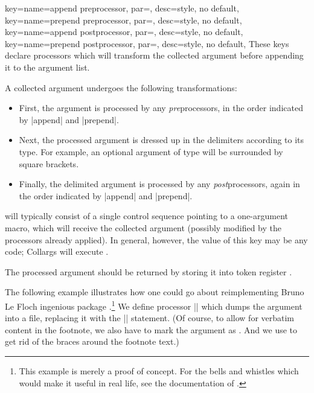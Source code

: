 \documentclass[a4paper,11pt]{article}
\begin{document}
\begin{doc}[
    pi={\raggedright
      \docaux{cmd}{collargsAppendPreprocessor},
      \docaux{cmd}{collargsPrependPreprocessor},
      \docaux{cmd}{collargsAppendPostprocessor},
      \docaux{cmd}{collargsPrependPostprocessor}},
  ]{
    key={name=append preprocessor, par=, desc={style, no default}},
    key={name=prepend preprocessor, par=, desc={style, no default}},
    key={name=append postprocessor, par=, desc={style, no default}},
    key={name=prepend postprocessor, par=, desc={style, no default}},
  }
  These keys declare processors which will transform the collected argument
  before appending it to the argument list.
  
  A collected argument undergoes the following transformations:
  \begin{itemize}
  \item First, the argument is processed by any \emph{pre}processors, in the
    order indicated by |append| and |prepend|.
  \item Next, the processed argument is dressed up in the delimiters according
    to its type.  For example, an optional argument of type 
    will be surrounded by square brackets.
  \item Finally, the delimited argument is processed by any
    \emph{post}processors, again in the order indicated by |append| and
    |prepend|.
  \end{itemize}

   will typically consist of a single control sequence pointing to a
  one-argument macro, which will receive the collected argument (possibly
  modified by the processors already applied).  In general, however, the value
  of this key may be any code; Collargs will execute .

  The processed argument should be returned by storing it into token register
  .

  The following example illustrates how one could go about reimplementing Bruno
  Le Floch ingenious package .\footnote{This example is merely a
    proof of concept.  For the bells and whistles which would make it useful in
    real life, see the documentation of .} We define processor
  |\writetofile| which dumps the argument into a file, replacing it with the
  || statement.  (Of course, to allow for verbatim content in the
  footnote, we also have to mark the argument as .
  And we use  to get rid of the braces around the
  footnote text.)
  
\end{doc}
\end{document}
